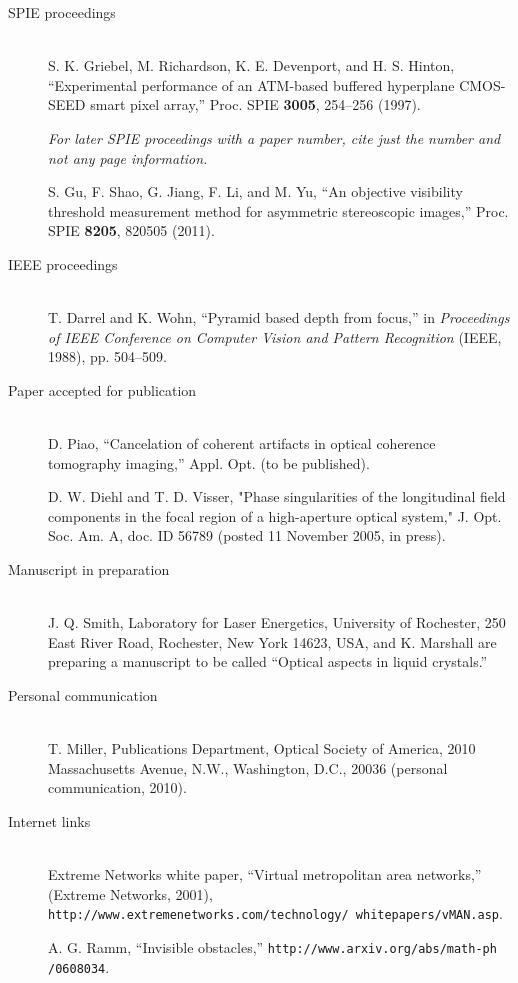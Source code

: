 \documentclass[10pt]{article}
\begin{document}
\begin{description}
\item[SPIE proceedings] \hfill\\
S. K. Griebel, M. Richardson, K. E. Devenport, and H. S. Hinton,
``Experimental performance of an ATM-based buffered hyperplane
CMOS-SEED smart pixel array,'' Proc. SPIE {\bfseries 3005}, 254--256 (1997).

{\itshape For later SPIE proceedings with a paper number, cite just the number and not any page information.}

S. Gu, F. Shao, G. Jiang, F. Li, and M. Yu,
``An objective visibility threshold measurement method for asymmetric stereoscopic images,''
Proc. SPIE {\bfseries 8205}, 820505 (2011).

\item[IEEE proceedings] \hfill\\
T. Darrel and K. Wohn, ``Pyramid based depth from focus,'' in
{\itshape Proceedings of IEEE Conference on Computer Vision and Pattern
Recognition} (IEEE, 1988), pp. 504--509.

\item[Paper accepted for publication] \hfill\\
D. Piao, ``Cancelation of coherent artifacts in optical coherence tomography imaging,'' Appl. Opt. (to be published).

D. W. Diehl and T. D. Visser,
"Phase singularities of the longitudinal field components in the focal region of a high-aperture optical system,"
J. Opt. Soc. Am. A, doc. ID 56789 (posted 11 November 2005, in press).

\item[Manuscript in preparation] \hfill\\
J. Q. Smith, Laboratory for Laser Energetics, University of Rochester, 250 East River Road, Rochester, New York 14623, USA, and K. Marshall are preparing a manuscript to be called ``Optical aspects in liquid crystals.''

\item[Personal communication] \hfill\\
T. Miller, Publications Department, Optical Society of
America, 2010 Massa\-chusetts Avenue, N.W., Washington, D.C.,
20036 (personal communication, 2010).

\item[Internet links] \hfill\\
Extreme Networks white paper, ``Virtual metropolitan area networks,'' (Extreme Networks, 2001), \texttt{http://www.extremenetworks.com/technology/
whitepapers/vMAN.asp}.

A. G. Ramm, ``Invisible obstacles,'' \texttt{http://www.arxiv.org/abs/math-ph
/0608034}.

\end{description}
\end{document}
